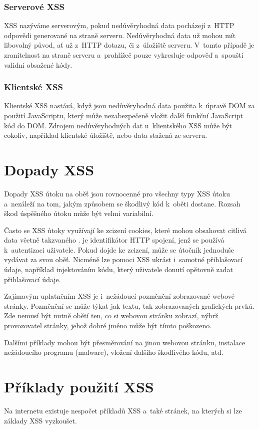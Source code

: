 \documentclass[11pt, conference, a4paper]{IEEEtran}
\begin{document}
\subsubsection{Serverové XSS}
XSS nazýváme serverovým, pokud nedůvěryhodná data pocházejí z~HTTP odpovědi generované na straně serveru. Nedůvěryhodná data už mohou mít libovolný původ, ať už z~HTTP dotazu, či z~úložiště serveru. V~tomto případě je zranitelnost na straně serveru a~prohlížeč pouze vykresluje odpověď a~spouští validní obsažené kódy.


\subsubsection{Klientské XSS}
Klientské XSS nastává, když jsou nedůvěryhodná data použita k~úpravě DOM za použití JavaScriptu, který může nezabezpečeně vložit další funkční JavaScript kód do DOM. Zdrojem nedůvěryhodných dat u~klientského XSS může být cokoliv, například klientské úložiště, nebo data stažená ze serveru.~\cite{TYPES-XSS-owasp}


\section{Dopady XSS}
Dopady XSS útoku na oběť jsou rovnocenné pro všechny typy XSS útoku a~nezáleží na tom, jakým způsobem se škodlivý kód k~oběti dostane. Rozsah škod úspěšného útoku může být velmi variabilní.

Často se XSS útoky využívají ke zcizení cookies, které mohou obsahovat citlivá data včetně takzvaného .  je identifikátor HTTP spojení, jenž se používá k~autentizaci uživatele. Pokud dojde ke zcizení, může se útočník jednoduše vydávat za svou oběť. Nicméně lze pomoci XSS ukrást i~samotné přihlašovací údaje, například injektováním kódu, který uživatele donutí opětovně zadat přihlašovací údaje. 

Zajímavým uplatněním XSS je i~nežádoucí pozměnění zobrazované webové stránky. Pozměnění se může týkat jak textu, tak zobrazovaných grafických prvků. Zde nemusí být nutně obětí ten, co si webovou stránku zobrazí, nýbrž provozovatel stránky, jehož dobré jméno může být tímto poškozeno. 

Dalšími příklady mohou být přesměrování na jinou webovou stránku, instalace nežádoucího programu \mbox{(malware)}, vložení dalšího škodlivého kódu, atd.


\section{Příklady použití XSS}
Na internetu existuje nespočet příkladů XSS a~také stránek, na kterých si lze základy XSS vyzkoušet. 
\end{document}
